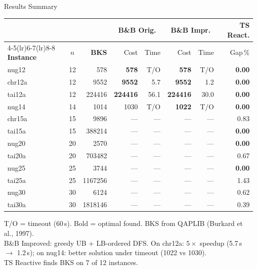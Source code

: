 \documentclass[aspectratio=169,11pt]{beamer}
\begin{document}
\begin{frame}[shrink=5]{Results Summary}
\centering
\small
\begin{tabular}{@{}l c r rr rr r@{}}
\toprule
 & & & \multicolumn{2}{c}{\textbf{B\&B Orig.}} &
      \multicolumn{2}{c}{\textbf{B\&B Impr.}} &
      \textbf{TS React.}\\
\cmidrule(lr){4-5}\cmidrule(lr){6-7}\cmidrule(lr){8-8}
\textbf{Instance} & $n$ & \textbf{BKS} & Cost & Time & Cost & Time & Gap\,\%\\
\midrule
nug12  & 12 & 578     & \textbf{578}    & T/O   & \textbf{578}   & T/O  & \textbf{0.00}\\
chr12a & 12 & 9552    & \textbf{9552}   & 5.7   & \textbf{9552} & 1.2  & \textbf{0.00}\\
tai12a & 12 & 224416  & \textbf{224416} & 56.1  & \textbf{224416} & 30.0 & \textbf{0.00}\\
nug14  & 14 & 1014    & 1030            & T/O   & \textbf{1022}  & T/O  & \textbf{0.00}\\
chr15a & 15 & 9896    & ---             & ---   & ---        & ---  & 0.83\\
tai15a & 15 & 388214  & ---             & ---   & ---        & ---  & \textbf{0.00}\\
nug20  & 20 & 2570    & ---             & ---   & ---        & ---  & \textbf{0.00}\\
tai20a & 20 & 703482  & ---             & ---   & ---        & ---  & 0.67\\
nug25  & 25 & 3744    & ---             & ---   & ---        & ---  & \textbf{0.00}\\
tai25a & 25 & 1167256 & ---             & ---   & ---        & ---  & 1.43\\
nug30  & 30 & 6124    & ---             & ---   & ---        & ---  & 0.62\\
tai30a & 30 & 1818146 & ---             & ---   & ---        & ---  & 0.39\\
\bottomrule
\end{tabular}
\vspace{4pt}

{\footnotesize T/O = timeout (60\,s). Bold = optimal found. BKS from QAPLIB (Burkard et al., 1997).\\
B\&B Improved: greedy UB + LB-ordered DFS. On chr12a: \alert{$5\times$ speedup} (5.7\,s $\to$ 1.2\,s); on nug14: better solution under timeout (1022 vs 1030).\\
TS Reactive finds BKS on 7 of 12 instances.}
\end{frame}
\end{document}
